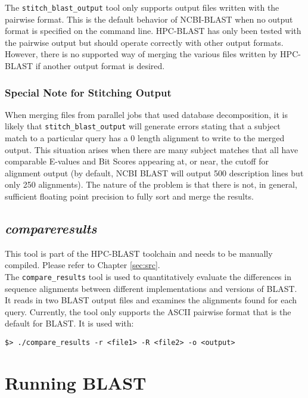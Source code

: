 \documentclass[10pt]{article}
\begin{document}
 The  \verb^stitch_blast_output^ tool only supports output files written with the pairwise format. This is the default behavior of NCBI-BLAST when no output format is specified on the command line. HPC-BLAST has only been tested with the pairwise output
but should operate correctly with other output formats. However, there is no supported way of merging the various files written by HPC-BLAST if another output format is desired.

\subsubsection{Special Note for Stitching Output} \label{sssec:stitch-note}

When merging files from parallel jobs that used database decomposition, it is likely that \verb^stitch_blast_output^ will generate errors stating that a subject match to a particular query has a 0 length alignment to write to the merged output.
This situation arises when there are many subject matches that all have comparable E-values and Bit Scores appearing at, or near, the cutoff for alignment output (by default, NCBI BLAST will output 500 description lines but only 250 alignments).
The nature of the problem is that there is not, in general, sufficient floating point precision to fully sort and merge the results.

\subsection{\emph{compare\textunderscore results}} \label{ssec:compres}

 This tool is part of the HPC-BLAST toolchain and needs to be manually compiled.  Please refer to Chapter \ref{sec:src}.\\

The \verb^compare_results^ tool is used to quantitatively evaluate the differences in sequence alignments between different implementations and versions of BLAST.  It reads in two BLAST output files and examines the alignments found for each
query.  Currently, the tool only supports the ASCII pairwise format that is the default for BLAST.  It is used with:
\begin{verbatim}
$> ./compare_results -r <file1> -R <file2> -o <output>
\end{verbatim}

\clearpage

\section{Running BLAST} \label{sec:execblast}
\end{document}
